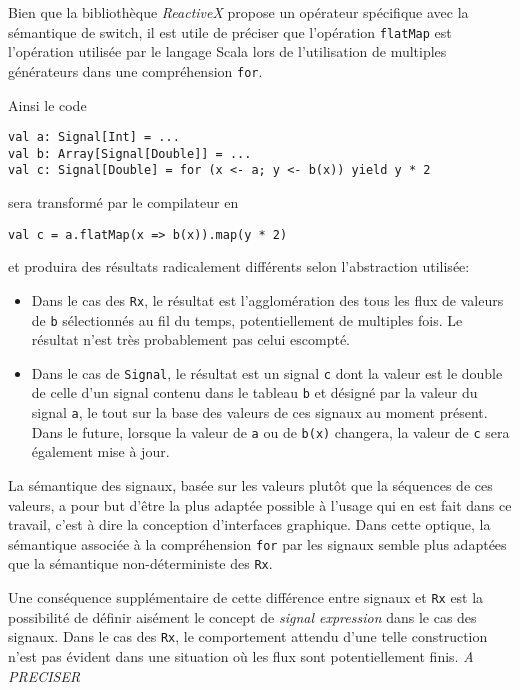 Bien que la bibliothèque \emph{ReactiveX} propose un opérateur spécifique avec la sémantique de switch, il est utile de préciser que l'opération \texttt{flatMap} est l'opération utilisée par le langage Scala lors de l'utilisation de multiples générateurs dans une compréhension \texttt{for}.

Ainsi le code
\begin{lstlisting}
val a: Signal[Int] = ...
val b: Array[Signal[Double]] = ...
val c: Signal[Double] = for (x <- a; y <- b(x)) yield y * 2
\end{lstlisting}

sera transformé par le compilateur en
\begin{lstlisting}
val c = a.flatMap(x => b(x)).map(y * 2)
\end{lstlisting}

et produira des résultats radicalement différents selon l'abstraction utilisée:

\begin{itemize}
	\item Dans le cas des \texttt{Rx}, le résultat est l'agglomération des tous les flux de valeurs de \texttt{b} sélectionnés au fil du temps, potentiellement de multiples fois. Le résultat n'est très probablement pas celui escompté.
	
	\item Dans le cas de \texttt{Signal}, le résultat est un signal \texttt{c} dont la valeur est le double de celle d'un signal contenu dans le tableau \texttt{b} et désigné par la valeur du signal \texttt{a}, le tout sur la base des valeurs de ces signaux au moment présent. Dans le future, lorsque la valeur de \texttt{a} ou de \texttt{b(x)} changera, la valeur de \texttt{c} sera également mise à jour.
\end{itemize}

La sémantique des signaux, basée sur les valeurs plutôt que la séquences de ces valeurs, a pour but d'être la plus adaptée possible à l'usage qui en est fait dans ce travail, c'est à dire la conception d'interfaces graphique. Dans cette optique, la sémantique associée à la compréhension \texttt{for} par les signaux semble plus adaptées que la sémantique non-déterministe des \texttt{Rx}.

Une conséquence supplémentaire de cette différence entre signaux et \texttt{Rx} est la possibilité de définir aisément le concept de \emph{signal expression} dans le cas des signaux. Dans le cas des \texttt{Rx}, le comportement attendu d'une telle construction n'est pas évident dans une situation où les flux sont potentiellement finis. \textit{A PRECISER}

